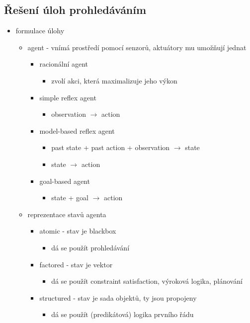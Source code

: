 \subsection{Řešení úloh prohledáváním}
\begin{itemize}
\item formulace úlohy
\begin{itemize}
\item agent - vnímá prostředí pomocí senzorů, aktuátory mu umožňují jednat
\begin{itemize}
\item racionální agent
\begin{itemize}
\item zvolí akci, která maximalizuje jeho výkon
\end{itemize}
\item simple reflex agent
\begin{itemize}
\item observation $\to$ action
\end{itemize}
\item model-based reflex agent
\begin{itemize}
\item past state + past action + observation $\to$ state
\item state $\to$ action
\end{itemize}
\item goal-based agent
\begin{itemize}
\item state + goal $\to$ action
\end{itemize}
\end{itemize}
\item reprezentace stavů agenta
\begin{itemize}
\item atomic - stav je blackbox
\begin{itemize}
\item dá se použít prohledávání
\end{itemize}
\item factored - stav je vektor
\begin{itemize}
\item dá se použít constraint satisfaction, výroková logika, plánování
\end{itemize}
\item structured - stav je sada objektů, ty jsou propojeny
\begin{itemize}
\item dá se použít (predikátová) logika prvního řádu

\end{itemize}
\end{itemize}
\end{itemize}
\end{itemize}
